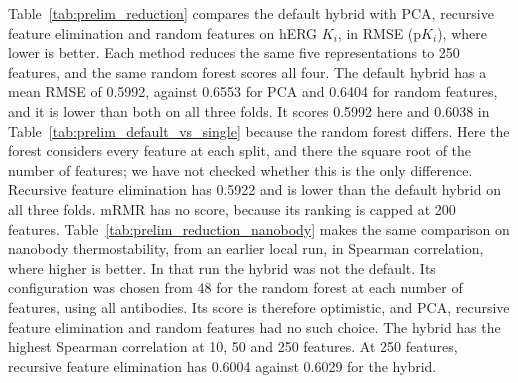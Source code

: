 Table~\ref{tab:prelim_reduction} compares the default hybrid with PCA, recursive feature elimination and random features on hERG $K_i$, in RMSE (p$K_i$), where lower is better. Each method reduces the same five representations to 250 features, and the same random forest scores all four. The default hybrid has a mean RMSE of 0.5992, against 0.6553 for PCA and 0.6404 for random features, and it is lower than both on all three folds. It scores 0.5992 here and 0.6038 in Table~\ref{tab:prelim_default_vs_single} because the random forest differs. Here the forest considers every feature at each split, and there the square root of the number of features; we have not checked whether this is the only difference. Recursive feature elimination has 0.5922 and is lower than the default hybrid on all three folds. mRMR has no score, because its ranking is capped at 200 features. Table~\ref{tab:prelim_reduction_nanobody} makes the same comparison on nanobody thermostability, from an earlier local run, in Spearman correlation, where higher is better. In that run the hybrid was not the default. Its configuration was chosen from 48 for the random forest at each number of features, using all antibodies. Its score is therefore optimistic, and PCA, recursive feature elimination and random features had no such choice. The hybrid has the highest Spearman correlation at 10, 50 and 250 features. At 250 features, recursive feature elimination has 0.6004 against 0.6029 for the hybrid.

